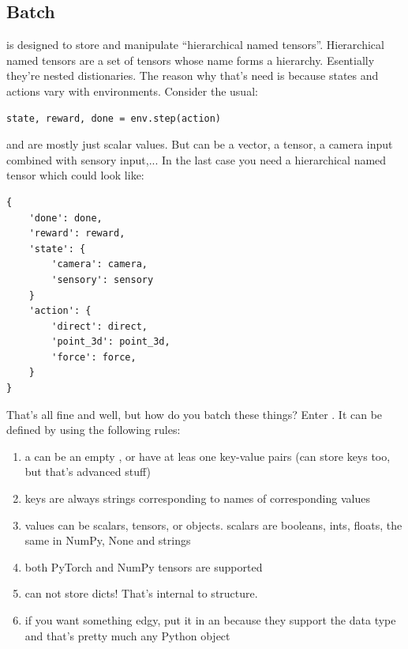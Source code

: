 \documentclass{article}
\begin{document}
\subsection{Batch}
 is designed to store and manipulate ``hierarchical named tensors''.
Hierarchical named tensors are a set of tensors whose name forms a hierarchy.
Esentially they're nested distionaries.
The reason why that's need is because states and actions vary with environments.
Consider the usual:
\begin{verbatim}
state, reward, done = env.step(action)
\end{verbatim}
 and 
 are mostly just scalar values.
But  can be a vector, a tensor, a camera input combined with sensory input,...
In the last case you need a hierarchical named tensor which could look like:
\begin{verbatim}
{
    'done': done,
    'reward': reward,
    'state': {
        'camera': camera,
        'sensory': sensory
    }
    'action': {
        'direct': direct,
        'point_3d': point_3d,
        'force': force,
    }
}
\end{verbatim}

That's all fine and well, but how do you batch these things?
Enter . It can be defined by using the following rules:
\begin{enumerate}
		\item a  can be an empty 
				, or have at leas one key-value pairs (can store keys too, but that's advanced stuff)
		\item keys are always strings corresponding to names of corresponding values
		\item values can be scalars, tensors, or  objects. scalars are booleans, ints, floats, the same in NumPy, None and strings
		\item both PyTorch  and NumPy 
				 tensors are supported
		\item {} can not store dicts! That's internal to 
				 structure.
		\item if you want something edgy, put it in an  because they support 
				the  data type and that's pretty much any Python object
\end{enumerate}
\end{document}
